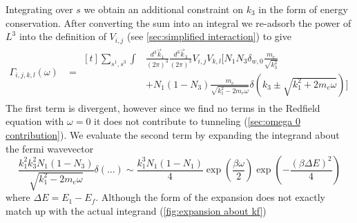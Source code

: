Integrating over \(s\) we obtain
an additional constraint on \(k_3\)
in the form of energy conservation. After
converting the sum into
an integral we re-adsorb
the power of \(L^3\) into the
definition of \(V_{i,j}\)
(see \cref{sec:simplified interaction})
to give
\begin{align}
    \Gamma_{i,j, k,l}(\omega) & =\begin{aligned}[t]
        \sum_{s^1,s^3} \int &
        \frac{d^3\vec{k}_1}{{(2\pi)}^3}
        \frac{d^3\vec{k}_3}{{(2\pi)}^3}
        V_{i,j} V_{k,l} [
        N_1 N_3 \delta_{w, 0} \frac{m_e}{\sqrt{k_3^2}} \\
                            & + N_1 (1 - N_3)
                \frac{m_e}{\sqrt{k_1^2 - 2m_e\omega}}
                \delta({k_3 \pm \sqrt{k_1^2 + 2m_e\omega}}) ]
    \end{aligned}\label{eqn:gamma integral form}
\end{align}
The first term is divergent, however
since we find no terms in the Redfield
equation with \(\omega = 0\)
it does not contribute to tunneling
(\cref{sec:omega 0 contribution}).
We evaluate the second term
by expanding the integrand about the fermi
wavevector
\begin{equation}
    \frac{k_1 ^ 2 k_3 ^ 2 N_1 (1 - N_3)}
    {\sqrt{k_1^2 - 2m_e\omega}}
    \delta(\dots)
    \sim
    \frac{k_1 ^ 3 N_1 (1 - N_1)}{4}
    \exp{(\frac{\beta \omega}{2})}
    \exp{(-\frac{{(\beta \Delta E)}^2}{4})}
\end{equation}
where \(\Delta E = E_1 - E_f\).
Although the form of the
expansion does not exactly
match up with the actual
integrand (\cref{fig:expansion about kf})
